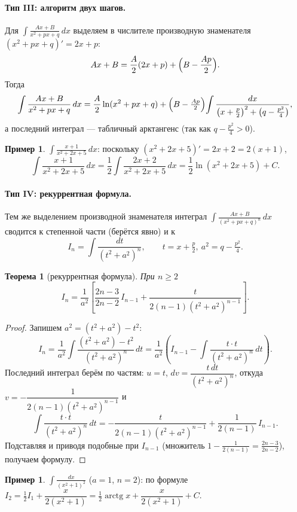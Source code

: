 \documentclass[11pt,a4paper]{article}
\theoremstyle{definition}
\newtheorem{example}[definition]{Пример}
\theoremstyle{plain}
\newtheorem{theorem}[definition]{Теорема}
\DeclareMathOperator{\arctg}{arctg}
\newcommand{\dx}{\,dx}
\newcommand{\dt}{\,dt}
\renewcommand{\ge}{\geqslant}
\begin{document}
\paragraph{Тип III: алгоритм двух шагов.} Для $\displaystyle\int\frac{Ax+B}{x^2+px+q}\dx$
выделяем в числителе производную знаменателя $(x^2+px+q)'=2x+p$:
\[
  Ax+B=\frac{A}{2}(2x+p)+\Bigl(B-\frac{Ap}{2}\Bigr).
\]
Тогда
\[
  \int\frac{Ax+B}{x^2+px+q}\dx
   =\frac{A}{2}\ln(x^2+px+q)
   +\Bigl(B-\tfrac{Ap}{2}\Bigr)\!\int\frac{dx}{\bigl(x+\frac p2\bigr)^2+\bigl(q-\frac{p^2}4\bigr)} ,
\]
а последний интеграл — табличный арктангенс (так как $q-\tfrac{p^2}4>0$).

\begin{example}
$\displaystyle\int\frac{x+1}{x^2+2x+5}\dx$: поскольку $(x^2+2x+5)'=2x+2=2(x+1)$,
\[
  \int\frac{x+1}{x^2+2x+5}\dx=\frac12\int\frac{2x+2}{x^2+2x+5}\dx=\frac12\ln(x^2+2x+5)+C.
\]
\end{example}

\paragraph{Тип IV: рекуррентная формула.} Тем же выделением производной знаменателя интеграл
$\displaystyle\int\frac{Ax+B}{(x^2+px+q)^n}\dx$ сводится к степенной части (берётся явно) и к
\[
  I_n=\int\frac{dt}{(t^2+a^2)^n},\qquad t=x+\tfrac p2,\ a^2=q-\tfrac{p^2}4 .
\]

\begin{theorem}[рекуррентная формула]
При $n\ge2$
\[
  I_n=\frac{1}{a^2}\left[\frac{2n-3}{2n-2}\,I_{n-1}+\frac{t}{2(n-1)(t^2+a^2)^{n-1}}\right].
\]
\end{theorem}

\begin{proof}
Запишем $a^2=(t^2+a^2)-t^2$:
\[
  I_n=\frac1{a^2}\int\frac{(t^2+a^2)-t^2}{(t^2+a^2)^n}\dt
     =\frac1{a^2}\left(I_{n-1}-\int\frac{t\cdot t}{(t^2+a^2)^n}\dt\right).
\]
Последний интеграл берём по частям: $u=t$, $dv=\dfrac{t\dt}{(t^2+a^2)^n}$, откуда
$v=-\dfrac{1}{2(n-1)(t^2+a^2)^{n-1}}$ и
\[
  \int\frac{t\cdot t}{(t^2+a^2)^n}\dt
   =-\frac{t}{2(n-1)(t^2+a^2)^{n-1}}+\frac{1}{2(n-1)}\,I_{n-1}.
\]
Подставляя и приводя подобные при $I_{n-1}$ (множитель $1-\tfrac1{2(n-1)}=\tfrac{2n-3}{2n-2}$),
получаем формулу.
\end{proof}

\begin{example}
$\displaystyle\int\frac{dx}{(x^2+1)^2}$ ($a=1$, $n=2$): по формуле
$I_2=\tfrac12 I_1+\dfrac{x}{2(x^2+1)}=\tfrac12\arctg x+\dfrac{x}{2(x^2+1)}+C$.
\end{example}
\end{document}
